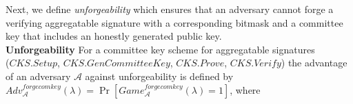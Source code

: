\noindent Next, we define \emph{unforgeability} which ensures that an adversary 
cannot forge a verifying aggregatable signature with a corresponding bitmask and a committee key 
that includes an honestly generated public key.\\


\noindent \textbf{Unforgeability}  For a committee key scheme for aggregatable signatures \\
($\mathit{CKS.Setup}$, $\mathit{CKS.GenCommitteeKey}$, $\mathit{CKS.Prove}$, 
$\mathit{CKS.Verify}$) the advantage of an 
adversary $\mathcal{A}$ against unforgeability is defined by \\
$\mathit{Adv}_{\mathcal{A}}^{\mathit{forgecomkey}}(\lambda) = \Pr[\mathit{Game}^{\mathit{forgecomkey}}_{\mathcal{A}}(\lambda) = 1]$, 
where

